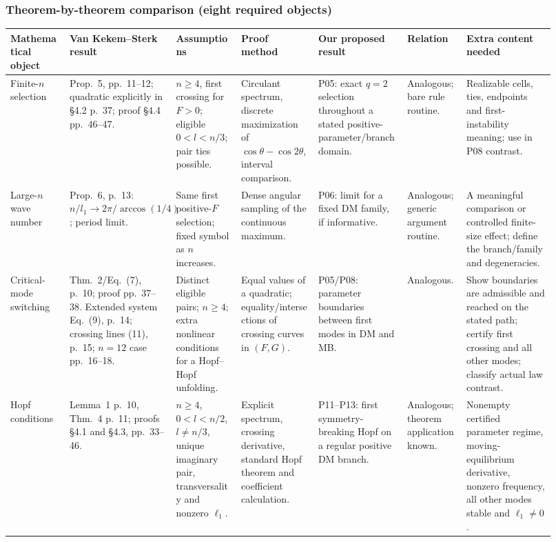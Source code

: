 \clearpage
\begin{landscape}
\subsubsection*{Theorem-by-theorem comparison (eight required objects)}
\small
\setlength{\tabcolsep}{3pt}
\renewcommand{\arraystretch}{1.15}
\begin{longtable}{>{\raggedright\arraybackslash}p{0.105\linewidth}>{\raggedright\arraybackslash}p{0.16\linewidth}>{\raggedright\arraybackslash}p{0.115\linewidth}>{\raggedright\arraybackslash}p{0.13\linewidth}>{\raggedright\arraybackslash}p{0.155\linewidth}>{\raggedright\arraybackslash}p{0.10\linewidth}>{\raggedright\arraybackslash}p{0.155\linewidth}}
\toprule Mathematical object & Van Kekem--Sterk result & Assumptions & Proof method & Our proposed result & Relation & Extra content needed \\
\midrule\endhead
Finite-$n$ selection & Prop.~5, pp.~11--12; quadratic explicitly in \S4.2 p.~37; proof \S4.4 pp.~46--47. & $n\ge4$, first crossing for $F>0$; eligible $0<l<n/3$; pair ties possible. & Circulant spectrum, discrete maximization of $\cos\theta-\cos2\theta$, interval comparison. & P05: exact $q=2$ selection throughout a stated positive-parameter/branch domain. & Analogous; bare rule routine. & Realizable cells, ties, endpoints and first-instability meaning; use in P08 contrast. \\
\addlinespace
Large-$n$ wave number & Prop.~6, p.~13: $n/l_1\to2\pi/\arccos(1/4)$; period limit. & Same first positive-$F$ selection; fixed symbol as $n$ increases. & Dense angular sampling of the continuous maximum. & P06: limit for a fixed DM family, if informative. & Analogous; generic argument routine. & A meaningful comparison or controlled finite-size effect; define the branch/family and degeneracies. \\
\addlinespace
Critical-mode switching & Thm.~2/Eq.~(7), p.~10; proof pp.~37--38. Extended system Eq.~(9), p.~14; crossing lines (11), p.~15; $n=12$ case pp.~16--18. & Distinct eligible pairs; $n\ge4$; extra nonlinear conditions for a Hopf--Hopf unfolding. & Equal values of a quadratic; equality/intersections of crossing curves in $(F,G)$. & P05/P08: parameter boundaries between first modes in DM and MB. & Analogous. & Show boundaries are admissible and reached on the stated path; certify first crossing and all other modes; classify actual law contrast. \\
\addlinespace
Hopf conditions & Lemma~1 p.~10, Thm.~4 p.~11; proofs \S4.1 and \S4.3, pp.~33--46. & $n\ge4$, $0<l<n/2$, $l\ne n/3$, unique imaginary pair, transversality and nonzero $\ell_1$. & Explicit spectrum, crossing derivative, standard Hopf theorem and coefficient calculation. & P11--P13: first symmetry-breaking Hopf on a regular positive DM branch. & Analogous; theorem application known. & Nonempty certified parameter regime, moving-equilibrium derivative, nonzero frequency, all other modes stable and $\ell_1\ne0$. \\

\end{longtable}
\end{landscape}
